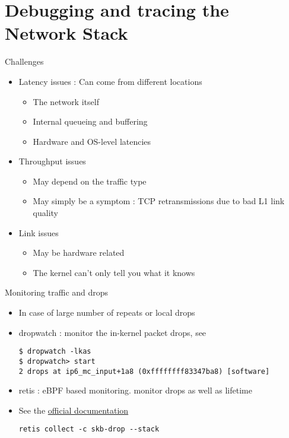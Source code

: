 \section{Debugging and tracing the Network Stack}

\begin{frame}{Challenges}
	\begin{itemize}
		\item Latency issues : Can come from different locations
			\begin{itemize}
				\item The network itself
				\item Internal queueing and buffering
				\item Hardware and OS-level latencies
			\end{itemize}
		\item Throughput issues
			\begin{itemize}
				\item May depend on the traffic type
				\item May simply be a symptom : TCP retransmissions due to bad L1 link quality
			\end{itemize}
		\item Link issues
			\begin{itemize}
				\item May be hardware related
				\item The kernel can't only tell you what it knows
			\end{itemize}
	\end{itemize}
\end{frame}

\begin{frame}[fragile]{Monitoring traffic and drops}
	\begin{itemize}
		\item In case of large number of repeats or local drops
		\item dropwatch : monitor the in-kernel packet drops, see 
			\begin{verbatim}
$ dropwatch -lkas
$ dropwatch> start
2 drops at ip6_mc_input+1a8 (0xffffffff83347ba8) [software]
			\end{verbatim}
		\item retis : eBPF based monitoring. monitor drops as well as  lifetime
		\item See the \href{https://retis.readthedocs.io/en/stable/}{official documentation}
			\begin{verbatim}
retis collect -c skb-drop --stack
			\end{verbatim}
	\end{itemize}
\end{frame}

